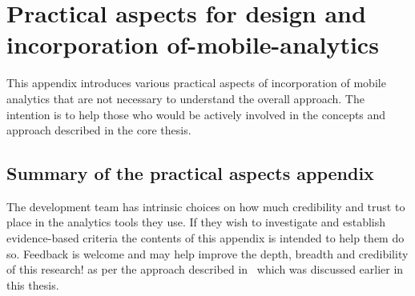 \chapter{Practical aspects for design and incorporation of-mobile-analytics}
This appendix introduces various practical aspects of incorporation of mobile analytics that are not necessary to understand the overall approach. The intention is to help those who would be actively involved in the concepts and approach described in the core thesis.





\section{Summary of the practical aspects appendix}
The development team has intrinsic choices on how much credibility and trust to place in the analytics tools they use. If they wish to investigate and establish evidence-based criteria the contents of this appendix is intended to help them do so. Feedback is welcome and may help improve the depth, breadth and credibility of this research! as per the approach described in~\cite{scaffidi2007developing} which was discussed earlier in this thesis.